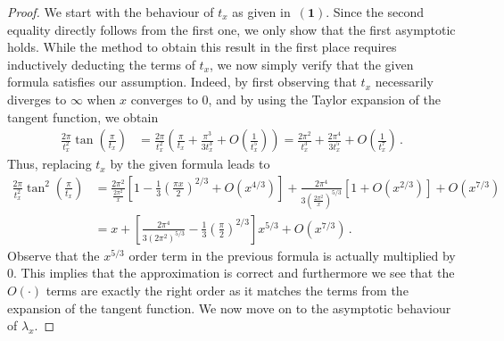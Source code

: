 \documentclass{article}
\newcommand{\1}{\mathbbm{1}}								%
\theoremstyle{definition}
\numberwithin{equation}{section}
\newcommand{\numitem}[1]{$\mathbf{(#1)}$}
\begin{document}
\begin{proof}
    We start with the behaviour of $t_x$ as given in~\numitem{1}.
    Since the second equality directly follows from the first one, we only show that the first asymptotic holds. 
    While the method to obtain this result in the first place requires inductively deducting the terms of $t_x$, we now simply verify that the given formula satisfies our assumption.
    Indeed, by first observing that $t_x$ necessarily diverges to $\infty$ when $x$ converges to $0$, and by using the Taylor expansion of the tangent function, we obtain
    \begin{align*}
        \frac{2\pi}{t_x^2}\tan\left(\frac{\pi}{t_x}\right)&=\frac{2\pi}{t_x^2}\left(\frac{\pi}{t_x}+\frac{\pi^3}{3t_x^3}+O\left(\frac{1}{t_x^5}\right)\right)=\frac{2\pi^2}{t_x^3}+\frac{2\pi^4}{3t_x^5}+O\left(\frac{1}{t_x^7}\right)\,.
    \end{align*}
    Thus, replacing $t_x$ by the given formula leads to
    \begin{align*}
        \frac{2\pi}{t_x^2}\tan^2\left(\frac{\pi}{t_x}\right)&=\frac{2\pi^2}{\frac{2\pi^2}{x}}\left[1-\frac{1}{3}\left(\frac{\pi x}{2}\right)^{2/3}+O\left(x^{4/3}\right)\right]+\frac{2\pi^4}{3\left(\frac{2\pi^2}{x}\right)^{5/3}}\left[1+O\left(x^{2/3}\right)\right]+O\left(x^{7/3}\right)\\
        &=x+\left[\frac{2\pi^4}{3(2\pi^2)^{5/3}}-\frac{1}{3}\left(\frac{\pi}{2}\right)^{2/3}\right]x^{5/3}+O\left(x^{7/3}\right)\,.
    \end{align*}
    Observe that the $x^{5/3}$ order term in the previous formula is actually multiplied by $0$.
    This implies that the approximation is correct and furthermore we see that the $O(\cdot)$ terms are exactly the right order as it matches the terms from the expansion of the tangent function.
    We now move on to the asymptotic behaviour of $\lambda_x$.


\end{proof}
\end{document}
